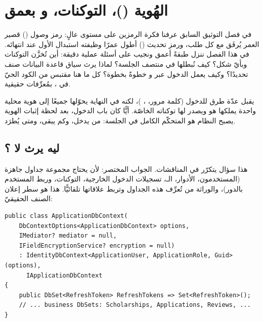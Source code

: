 \section{الهُوية ()، التوكنات، و بعمق}

في فصل التوثيق السابق عرفنا فكرة الرمزين على مستوى عالٍ: رمز وصول () قصير العمر يُرفَق مع كل طلب، ورمز تحديث () أطول عمرًا
وظيفته استبدال الأول عند انتهائه. في هذا الفصل ننزل طبقةً أعمق ونجيب على أسئلة
عملية دقيقة: أين تُخزَّن التوكنات وبأيّ شكل؟ كيف نُبطلها في منتصف الجلسة؟ لماذا يرث
سياق قاعدة البيانات صنف  تحديدًا؟ وكيف يعمل الدخول عبر 
و خطوةً بخطوة؟ كل ما هنا مقتبس من الكود الحيّ في ،
بمُعرِّفات حقيقية.

\begin{idea}
 يقبل عدّة طرق للدخول (كلمة مرور، ، )،
لكنه في النهاية يحوّلها جميعًا إلى هوية محلية واحدة يملكها هو ويصدر لها توكناته
الخاصّة. أيًّا كان باب الدخول، بعد لحظة إثبات الهوية يصبح النظام هو المتحكّم الكامل
في الجلسة: من يدخل، وكم يبقى، ومتى يُطرَد.
\end{idea}

\subsection{ليه  يرث  لا ؟}

هذا سؤال يتكرّر في المناقشات. الجواب المختصر: لأن 
يحتاج مجموعة جداول جاهزة (المستخدمون، الأدوار، الـ، تسجيلات الدخول
الخارجية، التوكنات، وربط المستخدم بالدور)، والوراثة من 
تُعرِّف هذه الجداول وتربط علاقاتها تلقائيًّا. هذا هو سطر إعلان الصنف الحقيقيّ:

\begin{english}
\begin{lstlisting}[language={[Sharp]C}]
public class ApplicationDbContext(
    DbContextOptions<ApplicationDbContext> options,
    IMediator? mediator = null,
    IFieldEncryptionService? encryption = null)
    : IdentityDbContext<ApplicationUser, ApplicationRole, Guid>(options),
      IApplicationDbContext
{
    public DbSet<RefreshToken> RefreshTokens => Set<RefreshToken>();
    // ... business DbSets: Scholarships, Applications, Reviews, ...
}
\end{lstlisting}
\end{english}

